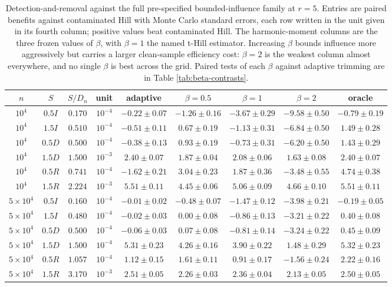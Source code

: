 \begin{table}[H]
\centering
\footnotesize
\setlength{\tabcolsep}{3pt}
\begin{tabular}{ccccccccc}
\toprule
$n$ & $S$ & $S/D_n$ & unit & adaptive & $\beta{=}0.5$ & $\beta{=}1$ & $\beta{=}2$ & oracle\\
\midrule
$10^4$ & $0.5I$ & $0.170$ & $10^{-4}$ & $-0.22\pm0.07$ & $-1.26\pm0.16$ & $-3.67\pm0.29$ & $-9.58\pm0.50$ & $-0.79\pm0.19$\\
$10^4$ & $1.5I$ & $0.510$ & $10^{-4}$ & $-0.51\pm0.11$ & $0.67\pm0.19$ & $-1.13\pm0.31$ & $-6.84\pm0.50$ & $1.49\pm0.28$\\
$10^4$ & $0.5D$ & $0.500$ & $10^{-4}$ & $-0.38\pm0.13$ & $0.93\pm0.19$ & $-0.73\pm0.31$ & $-6.20\pm0.50$ & $1.43\pm0.29$\\
$10^4$ & $1.5D$ & $1.500$ & $10^{-3}$ & $2.40\pm0.07$ & $1.87\pm0.04$ & $2.08\pm0.06$ & $1.63\pm0.08$ & $2.40\pm0.07$\\
$10^4$ & $0.5R$ & $0.741$ & $10^{-4}$ & $-1.62\pm0.21$ & $3.04\pm0.23$ & $1.87\pm0.36$ & $-3.48\pm0.55$ & $4.74\pm0.38$\\
$10^4$ & $1.5R$ & $2.224$ & $10^{-3}$ & $5.51\pm0.11$ & $4.45\pm0.06$ & $5.06\pm0.09$ & $4.66\pm0.10$ & $5.51\pm0.11$\\
\midrule
$5{\times}10^4$ & $0.5I$ & $0.160$ & $10^{-4}$ & $-0.01\pm0.02$ & $-0.48\pm0.07$ & $-1.47\pm0.12$ & $-3.98\pm0.21$ & $-0.19\pm0.05$\\
$5{\times}10^4$ & $1.5I$ & $0.480$ & $10^{-4}$ & $-0.02\pm0.03$ & $0.00\pm0.08$ & $-0.86\pm0.13$ & $-3.21\pm0.22$ & $0.40\pm0.08$\\
$5{\times}10^4$ & $0.5D$ & $0.500$ & $10^{-4}$ & $-0.06\pm0.03$ & $0.07\pm0.08$ & $-0.81\pm0.14$ & $-3.24\pm0.22$ & $0.45\pm0.09$\\
$5{\times}10^4$ & $1.5D$ & $1.500$ & $10^{-4}$ & $5.31\pm0.23$ & $4.26\pm0.16$ & $3.90\pm0.22$ & $1.48\pm0.29$ & $5.32\pm0.23$\\
$5{\times}10^4$ & $0.5R$ & $1.057$ & $10^{-4}$ & $1.12\pm0.15$ & $1.61\pm0.11$ & $0.91\pm0.17$ & $-1.56\pm0.24$ & $2.22\pm0.16$\\
$5{\times}10^4$ & $1.5R$ & $3.170$ & $10^{-3}$ & $2.51\pm0.05$ & $2.26\pm0.03$ & $2.36\pm0.04$ & $2.13\pm0.05$ & $2.50\pm0.05$\\
\bottomrule
\end{tabular}
\caption{Detection-and-removal against the full pre-specified bounded-influence family at $r=5$.  Entries are paired benefits against contaminated Hill with Monte Carlo standard errors, each row written in the unit given in its fourth column; positive values beat contaminated Hill.  The harmonic-moment columns are the three frozen values of $\beta$, with $\beta=1$ the named t-Hill estimator.  Increasing $\beta$ bounds influence more aggressively but carries a larger clean-sample efficiency cost: $\beta=2$ is the weakest column almost everywhere, and no single $\beta$ is best across the grid.  Paired tests of each $\beta$ against adaptive trimming are in Table \ref{tab:beta-contrasts}.}
\label{tab:estimator-crossover}
\end{table}
